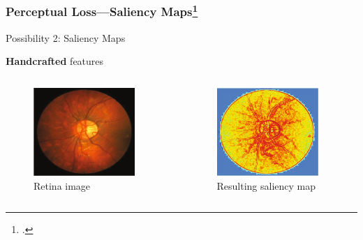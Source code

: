 \documentclass{beamer}
\begin{document}
\begin{frame}
  \frametitle{Perceptual Loss---Saliency Maps\footcite{SaliencyGAN}}
   \alert{Possibility 2}: Saliency Maps

  \textbf{Handcrafted} features
\begin{columns}
  \begin{column}{0.5\linewidth}
    \begin{figure}[h]
      \centering
        \includegraphics[width=0.9\textwidth]{saliency_gt}
      \caption*{Retina image}
    \end{figure}
  \end{column}
  \begin{column}{0.5\linewidth}
    \begin{figure}[h]
      \centering
        \includegraphics[width=0.9\textwidth]{saliency_smap}
      \caption*{Resulting saliency map}
    \end{figure}
  \end{column} 
\end{columns}
\end{frame}
\end{document}
